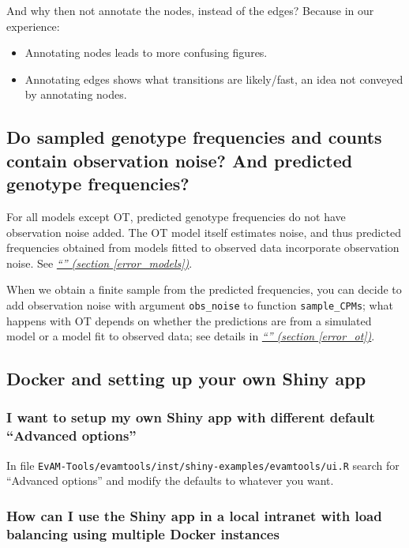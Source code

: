 \documentclass[a4paper,11pt]{article}
\newcommand*{\qref}[1]{\hyperref[{#1}]{\textit{``\nameref*{#1}'' (section \ref*{#1})}}}
\begin{document}
And why then not annotate the nodes, instead of the edges? Because in our experience:
\begin{itemize}
\item Annotating nodes leads to more confusing figures.
\item Annotating edges shows what transitions are likely/fast, an idea not conveyed by annotating nodes.
\end{itemize}



\subsection{Do sampled genotype frequencies and counts contain observation noise? And predicted genotype frequencies?}
\label{sec:do-sampled-genotype}

For all models except OT, predicted genotype frequencies do not have observation noise added. The OT model itself estimates noise, and thus predicted frequencies obtained from models fitted to observed data incorporate observation noise. See \qref{error_models}.

When we obtain a finite sample from the predicted frequencies, you can decide to add observation noise with argument \texttt{obs\_noise} to function \texttt{sample\_CPMs}; what happens with OT depends on whether the predictions are from a simulated model or a model fit to observed data; see details in \qref{error_ot}.



\subsection{Docker and setting up your own Shiny app}
\subsubsection{I want to setup my own Shiny app with different default ``Advanced options''}

In file \texttt{EvAM-Tools/evamtools/inst/shiny-examples/evamtools/ui.R} search for ``Advanced options'' and modify the defaults to whatever you want.


\subsubsection{How can I use the Shiny app in a local intranet with load balancing using multiple Docker instances}
\label{haproxy}
\end{document}
